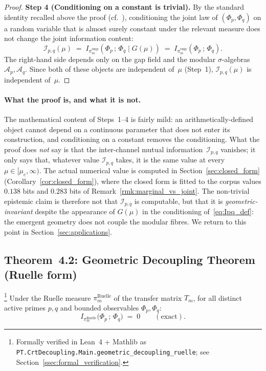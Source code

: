 \begin{proof}
\textbf{Step 4 (Conditioning on a constant is trivial).}
By the standard identity recalled above the proof
(cf.~\cite[\S~2.5]{CoverThomas2006}), conditioning the joint law of
$(\Phi_p, \Phi_q)$ on a random variable that is almost surely
constant under the relevant measure does not change the joint
information content:
\begin{equation}
  \mathcal{I}_{p,q}(\mu)
  \;=\; I_{\pi_m^{\mathrm{emp}}}(\Phi_p\,;\,\Phi_q \mid G(\mu))
  \;=\; I_{\pi_m^{\mathrm{emp}}}(\Phi_p\,;\,\Phi_q).
  \label{eq:Ipq_reduced}
\end{equation}
The right-hand side depends only on the gap field and the modular
$\sigma$-algebras $\mathcal{A}_p, \mathcal{A}_q$. Since both of these
objects are independent of~$\mu$ (Step~1),
$\mathcal{I}_{p,q}(\mu)$ is independent of~$\mu$.
\end{proof}

\paragraph{What the proof is, and what it is not.}
The mathematical content of Steps~1--4 is fairly mild: an
arithmetically-defined object cannot depend on a continuous parameter
that does not enter its construction, and conditioning on a constant
removes the conditioning. What the proof does \emph{not} say is that
the inter-channel mutual information~$\mathcal{I}_{p,q}$ vanishes; it
only says that, whatever value $\mathcal{I}_{p,q}$ takes, it is the
same value at every $\mu \in [\mu_c, \infty)$. The actual numerical
value is computed in Section~\ref{sec:closed_form}
(Corollary~\ref{cor:closed_form}), where the closed form is fitted to
the corpus values $0.138$ bits and $0.283$ bits of
Remark~\ref{rmk:marginal_vs_joint}. The non-trivial epistemic claim
is therefore not that $\mathcal{I}_{p,q}$ is computable, but that it
is \emph{geometric-invariant} despite the appearance of $G(\mu)$ in
the conditioning of~\eqref{eq:Ipq_def}: the emergent geometry does
not couple the modular fibres. We return to this point in
Section~\ref{sec:applications}.

\subsection{Theorem~4.2: Geometric Decoupling Theorem (Ruelle form)}
\label{ssec:thm_4_2_proof}

\begin{theorem}
\label{thm:ruelle_zero}
\footnote{Formally verified in Lean~4 + Mathlib as
\texttt{PT.CrtDecoupling.Main.geometric\_decoupling\_ruelle};
see Section~\ref{ssec:formal_verification}.}
Under the Ruelle measure $\pi_m^{\mathrm{Ruelle}}$ of the
transfer matrix $T_m$, for all distinct active primes $p, q$ and
bounded observables $\Phi_p, \Phi_q$:
\begin{equation}
  I_{\pi_m^{\mathrm{Ruelle}}}\!\bigl(\Phi_p \,;\, \Phi_q\bigr)
  \;=\; 0
  \qquad (\text{exact}).
  \label{eq:ruelle_zero}
\end{equation}
\end{theorem}

